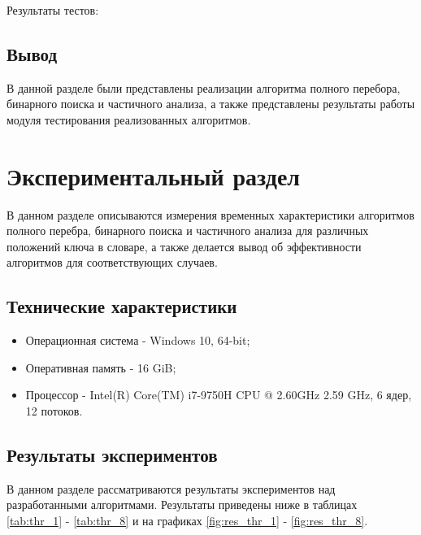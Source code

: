 Результаты тестов:

\section{Вывод}
В данной разделе были представлены реализации алгоритма полного перебора, бинарного поиска и частичного анализа, а также представлены результаты работы модуля тестирования реализованных алгоритмов.

\chapter{Экспериментальный раздел}

В данном разделе описываются измерения временных характеристики алгоритмов полного перебра, бинарного поиска и частичного анализа для различных положений ключа в словаре, а также делается вывод об эффективности алгоритмов для соответствующих случаев.

\section{Технические характеристики}
\begin{itemize}
	\item Операционная система - Windows 10, 64-bit;
	\item Оперативная память - 16 GiB;
	\item Процессор - Intel(R) Core(TM) i7-9750H CPU @ 2.60GHz 2.59 GHz, 6 ядер, 12 потоков.
\end{itemize}

\section{Результаты экспериментов}
В данном разделе рассматриваются результаты экспериментов над разработанными алгоритмами. Результаты приведены ниже в таблицах \ref{tab:thr_1} -  \ref{tab:thr_8} и на графиках \ref{fig:res_thr_1} - \ref{fig:res_thr_8}.

